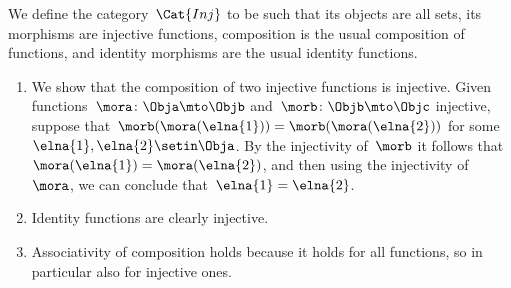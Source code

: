 \begin{solution}
    We define the category~$\Cat{Inj}$ to be such that its objects are all sets, its morphisms are injective functions, composition is the usual composition of functions, and identity morphisms are the usual identity functions.
    \begin{enumerate}
        \item We show that the composition of two injective functions is injective.
              Given functions~$\mora \colon \Obja \mto  \Objb$ and~$\morb \colon \Objb \mto \Objc$ injective, suppose that~$\morb(\mora (\elna{1})) = \morb(\mora (\elna{2}))$ for some~$\elna{1}, \elna{2} \setin \Obja$.
              By the injectivity of~$\morb$ it follows that~$\mora (\elna{1}) = \mora (\elna{2})$, and then using the injectivity of~$\mora$, we can conclude that~$\elna{1} = \elna{2}$.
        \item Identity functions are clearly injective.
        \item Associativity of composition holds because it holds for all functions, so in particular also for injective ones.
    \end{enumerate}
\end{solution}

